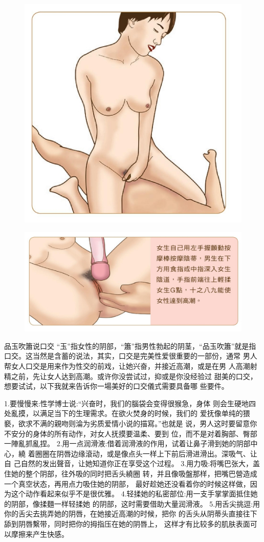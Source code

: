 \documentclass[12pt,UTF8]{ctexbook}
\begin{document}
\begin{figure}[htbp]
	\centering
	\includegraphics[width=0.7\linewidth]{17}
	\caption{}
	\label{fig:1}
\end{figure}

\begin{figure}[htbp]
	\centering
	\includegraphics[width=0.7\linewidth]{18}
	\caption{}
	\label{fig:1}
\end{figure}

品玉吹簫说口交
“玉”指女性的阴部，“簫”指男性勃起的阴茎，“品玉吹簫”就是指
口交。这当然是含蓄的说法，其实，口交是完美性爱很重要的一部份，通常
男人帮女人口交是用来作为性交的前戏，让她兴奋，并接近高潮，或是在男
人高潮射精之前，先让女人达到高潮。或许你没尝试过，抑或是你没经验过
甜美的口交，想要试试，以下我就来告诉你一場美好的口交儀式需要具备哪
些要件。

1.要慢慢来:性学博士说:“兴奋时，我们的腦袋会变得很猴急，身体
则会生硬地四处亂摸，以满足当下的生理需求。在欲火焚身的时候，我们的
爱抚像单纯的猥褻，欲求不满的親吻则淪为劣质爱情小说的描寫。”也就是
说，男人这时要留意你不安分的身体的所有动作，对女人抚摸要温柔、要到
位，而不是对着胸部、臀部一陣亂抓亂捏。
2.用一点润滑液:借着润滑液的作用，试着让鼻子滑到她的阴部中心，繞
着圈圈在阴唇边缘滾动，或是像点头一样上下前后滑进滑出。深吸气、让自
己自然的发出聲音，让她知道你正在享受这个过程。
3.用力吸:将嘴巴张大，盖住她的整个阴部，往外吸的同时把舌头繞圈
转，并且像吸盤那样，把嘴巴營造成一个真空状态，再用点力吸住她的阴部，
最好趁她还没看着你的时候这样做，因为这个动作看起来似乎不是很优雅。
4.轻揉她的私密部位:用一支手掌掌面抵住她的阴部，像揉麵一样轻揉她
的阴部，这时需要借助大量润滑液。
5.用舌尖挑逗:用你的舌尖去挑弄她的阴唇，在她接近高潮的时候，把你
的舌头从阴蒂头直接往下舔到阴唇繫带，同时把你的拇指压在她的阴唇上，
这样才有比较多的肌肤表面可以摩擦来产生快感。
\end{document}
